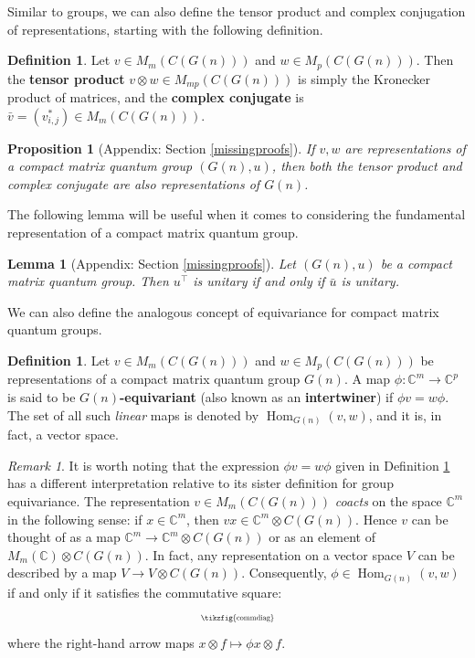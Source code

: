 \documentclass{article}
\DeclareMathOperator{\Hom}{Hom}
\theoremstyle{plain}
\newtheorem{proposition}[theorem]{Proposition}
\newtheorem{lemma}[theorem]{Lemma}
\theoremstyle{definition}
\newtheorem{definition}[theorem]{Definition}
\theoremstyle{remark}
\newtheorem{remark}[theorem]{Remark}
\begin{document}
Similar to groups, we can also define the tensor product and 
complex conjugation of representations, 
starting with the following definition.
\begin{definition}
	Let $v \in M_m(C(G(n)))$ and $w \in M_p(C(G(n)))$.
	Then the \textbf{tensor product} $v \otimes w \in M_{mp}(C(G(n)))$ is simply 
	the Kronecker product of matrices, 
	and the \textbf{complex conjugate} is $\bar{v} = (v_{i,j}^{*}) \in M_m(C(G(n)))$.
\end{definition}

\begin{proposition}[Appendix: Section \ref{missingproofs}] \label{tensconjcmqg}
	If $v, w$ are representations of a compact matrix quantum group $(G(n), u)$, 
	then both the tensor product and complex conjugate 
	are also representations of $G(n)$.
\end{proposition}


The following lemma will be useful when it comes to considering
the fundamental representation of a compact matrix quantum group.

\begin{lemma}[Appendix: Section \ref{missingproofs}] \label{conjunitary}
	Let $(G(n),u)$ be a compact matrix quantum group. Then
	$u^\top$ is unitary if and only if $\bar{u}$ is unitary.
\end{lemma}

We can also define the analogous concept of equivariance 
for compact matrix quantum groups.
\begin{definition} \label{quantumgroupequiv}
	Let $v \in M_m(C(G(n)))$ and $w \in M_p(C(G(n)))$ be representations of 
	a compact matrix quantum group $G(n)$.
	A map $\phi: \mathbb{C}^m \rightarrow \mathbb{C}^p$ is said to be 
	\textbf{$G(n)$-equivariant} (also known as an \textbf{intertwiner}) 
	if $\phi v = w\phi$.
	The set of all such \textit{linear} maps is denoted by 
	$\Hom_{G(n)}(v,w)$, and it is, in fact, a vector space.
\end{definition}

\begin{remark}
	It is worth noting that the expression $\phi v = w\phi$ given in 
	Definition \ref{quantumgroupequiv} has a different interpretation 
	relative to its sister definition for group equivariance.
	The representation $v \in M_m(C(G(n)))$ \textit{coacts} on the space 
	$\mathbb{C}^m$ in the following sense: if $x \in \mathbb{C}^m$, then 
	$vx \in \mathbb{C}^m \otimes C(G(n))$.
	Hence $v$ can be thought of as a map 
	$\mathbb{C}^m \rightarrow \mathbb{C}^m \otimes C(G(n))$ 
	or as an element of $M_m(\mathbb{C}) \otimes C(G(n))$.
	In fact, any representation on a vector space $V$ can be described by a 
	map $V \rightarrow V \otimes C(G(n))$.
	Consequently, $\phi \in \Hom_{G(n)}(v,w)$ if and only if 
	it satisfies the commutative square:
	\begin{equation}
		\scalebox{0.6}{\tikzfig{commdiag}}
	\end{equation}
	where the right-hand arrow maps $x \otimes f \mapsto \phi{x} \otimes f$.
\end{remark}
\end{document}
